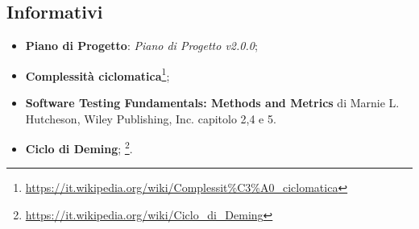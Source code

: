 \subsection{Informativi}
\label{RiferimentiInformativi}
\begin{itemize}
	\item \textbf{Piano di Progetto}: \textit{Piano di Progetto v2.0.0};
	\item \textbf{Complessità ciclomatica}\footnote{\url{https://it.wikipedia.org/wiki/Complessit\%C3\%A0_ciclomatica}};
	\item \textbf{Software Testing Fundamentals: Methods and Metrics} di Marnie L. Hutcheson, Wiley Publishing, Inc. capitolo 2,4 e 5.
	\item \textbf{Ciclo di Deming};
	\footnote{\url{https://it.wikipedia.org/wiki/Ciclo_di_Deming}}.
\end{itemize}
